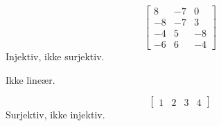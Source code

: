 \begin{oppgave}


\end{oppgave}

\begin{losning}


\begin{punkt}
$$\begin{bmatrix}
8 & -7 & 0\\
-8 & -7 & 3\\
-4 & 5 & -8\\
-6 & 6 & -4
\end{bmatrix}$$
Injektiv, ikke surjektiv.
\end{punkt}

\begin{punkt}
Ikke lineær.
\end{punkt}

\begin{punkt}
$$\begin{bmatrix}
1 & 2 & 3 & 4
\end{bmatrix}$$
Surjektiv, ikke injektiv.
\end{punkt}




\end{losning}



